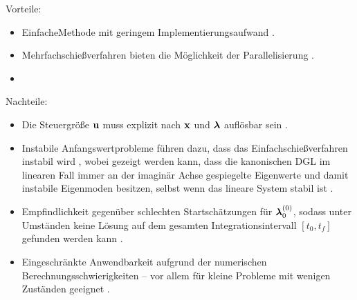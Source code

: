 \begin{multicols}{2}
	Vorteile:
	\begin{itemize}
		\item \glqq Einfache\grqq Methode mit geringem Implementierungsaufwand \cite{Ascher.1995c4}.
		\item Mehrfachschießverfahren bieten die Möglichkeit der Parallelisierung \cite{Betts.1998}.\vspace{\fill}
		\item[\vspace{\fill}]
	\end{itemize}
	
	\columnbreak
	
	Nachteile:
	\begin{itemize}
		\item Die Steuergröße $\boldsymbol{\mathrm{u}}$ muss explizit nach $\boldsymbol{\mathrm{x}}$ und $\boldsymbol{\mathrm{\lambda}}$ auflösbar sein \cite{Papageorgiou.2012}.\vspace{\fill}
		\item Instabile Anfangswertprobleme führen dazu, dass das Einfachschießverfahren instabil wird \cite{Ascher.1995c4}, wobei gezeigt werden kann, dass die kanonischen \gls{DGL} im linearen Fall immer an der imaginär Achse gespiegelte Eigenwerte und damit instabile Eigenmoden besitzen, selbst wenn das lineare System stabil ist \cite{KnutGraichen.2012}. 
		\item Empfindlichkeit gegenüber schlechten Startschätzungen für $\boldsymbol{\mathrm{\lambda}}_0^{(0)}$, sodass unter Umständen keine Lösung auf dem gesamten Integrationsintervall $[t_0, t_f]$ gefunden werden kann \cite{Ascher.1995c4}.
		\item Eingeschränkte Anwendbarkeit aufgrund der numerischen Berechnungsschwierigkeiten -- vor allem für kleine Probleme mit wenigen Zuständen geeignet \cite{Papageorgiou.2012}.
	\end{itemize}
\end{multicols}

